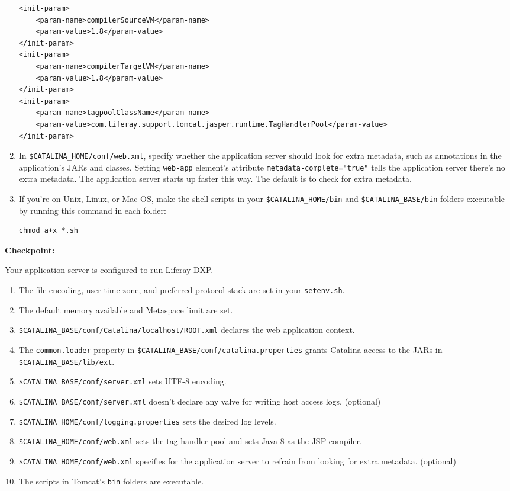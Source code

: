 \begin{enumerate}
\begin{verbatim}
<init-param>
    <param-name>compilerSourceVM</param-name>
    <param-value>1.8</param-value>
</init-param>
<init-param>
    <param-name>compilerTargetVM</param-name>
    <param-value>1.8</param-value>
</init-param>
<init-param>
    <param-name>tagpoolClassName</param-name>
    <param-value>com.liferay.support.tomcat.jasper.runtime.TagHandlerPool</param-value>
</init-param>
\end{verbatim}
\item
  In \texttt{\$CATALINA\_HOME/conf/web.xml}, specify whether the
  application server should look for extra metadata, such as annotations
  in the application's JARs and classes. Setting \texttt{web-app}
  element's attribute \texttt{metadata-complete="true"} tells the
  application server there's no extra metadata. The application server
  starts up faster this way. The default is to check for extra metadata.
\item
  If you're on Unix, Linux, or Mac OS, make the shell scripts in your
  \texttt{\$CATALINA\_HOME/bin} and \texttt{\$CATALINA\_BASE/bin}
  folders executable by running this command in each folder:

\begin{verbatim}
chmod a+x *.sh
\end{verbatim}
\end{enumerate}

\textbf{Checkpoint:}

Your application server is configured to run Liferay DXP.

\begin{enumerate}
\def\labelenumi{\arabic{enumi}.}
\item
  The file encoding, user time-zone, and preferred protocol stack are
  set in your \texttt{setenv.sh}.
\item
  The default memory available and Metaspace limit are set.
\item
  \texttt{\$CATALINA\_BASE/conf/Catalina/localhost/ROOT.xml} declares
  the web application context.
\item
  The \texttt{common.loader} property in
  \texttt{\$CATALINA\_BASE/conf/catalina.properties} grants Catalina
  access to the JARs in \texttt{\$CATALINA\_BASE/lib/ext}.
\item
  \texttt{\$CATALINA\_BASE/conf/server.xml} sets UTF-8 encoding.
\item
  \texttt{\$CATALINA\_BASE/conf/server.xml} doesn't declare any valve
  for writing host access logs. (optional)
\item
  \texttt{\$CATALINA\_HOME/conf/logging.properties} sets the desired log
  levels.
\item
  \texttt{\$CATALINA\_HOME/conf/web.xml} sets the tag handler pool and
  sets Java 8 as the JSP compiler.
\item
  \texttt{\$CATALINA\_HOME/conf/web.xml} specifies for the application
  server to refrain from looking for extra metadata. (optional)
\item
  The scripts in Tomcat's \texttt{bin} folders are executable.
\end{enumerate}

